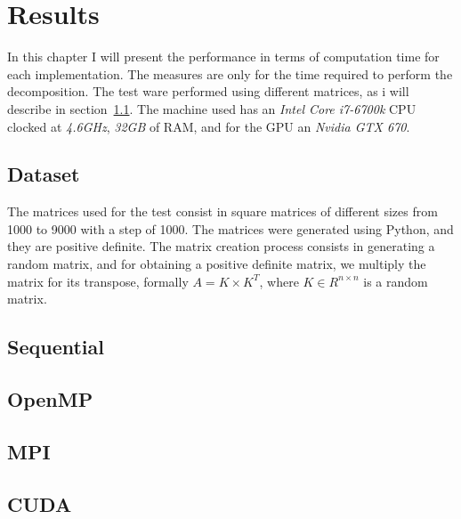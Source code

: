 \chapter{Results}
\label{results_computations}
In this chapter I will present the performance in terms of computation time for each implementation. The measures are only for the time required to perform the decomposition. The test ware performed using different matrices, as i will describe in section~\ref{Dataset}. The machine used has an \textit{Intel Core i7-6700k} CPU clocked at \textit{4.6GHz}, \textit{32GB} of RAM, and for the GPU an \textit{Nvidia GTX 670}.
\section{Dataset}
\label{Dataset}
The matrices used for the test consist in square matrices of different sizes from 1000 to 9000 with a step of 1000. The matrices were generated using Python, and they are positive definite. The matrix creation process consists in generating a random matrix, and for obtaining a positive definite matrix, we multiply the matrix for its transpose, formally $A = K \times K^{T}$, where $K \in R^{n \times n}$ is a random matrix. 

\section{Sequential}
\section{OpenMP}
\section{MPI}
\section{CUDA}